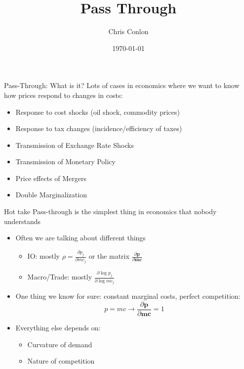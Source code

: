 

\usepackage{tabularx}
\usepackage{dcolumn}
\usepackage{ragged2e}
\usepackage{multirow,multicol,dcolumn}





\title{Pass Through}
\author{Chris Conlon}
\date{\today}

\frame{\titlepage}


\begin{frame}{Pass-Through: What is it?}
Lots of cases in economics where we want to know how prices respond to changes in costs:

\begin{itemize}
    \item Response to cost shocks (oil shock, commodity prices)
    \item Response to tax changes (incidence/efficiency of taxes)
    \item Transmission of Exchange Rate Shocks
    \item Transmission of Monetary Policy
    \item Price effects of Mergers
    \item Double Marginalization
\end{itemize}
\end{frame}


\begin{frame}{Hot take}
Pass-through is the simplest thing in economics that nobody understands
\begin{itemize}
\item Often we are talking about different things
\begin{itemize}
\item IO: mostly $\rho = \frac{\partial p_j}{\partial mc_j}$ or the matrix $\frac{\partial \mathbf{p}}{\partial \mathbf{mc}}$
\item Macro/Trade: mostly $\frac{\partial \log p_j}{\partial \log mc_j}$
\end{itemize}
\item One thing we know for sure: constant marginal costs, perfect competition: \\
 $$p = mc \rightarrow \frac{\partial \mathbf{p}}{\partial \mathbf{mc}} = 1$$
 \item Everything else depends on:
\begin{itemize}
\item Curvature of demand
\item Nature of competition
\end{itemize}
\end{itemize}
\end{frame}


